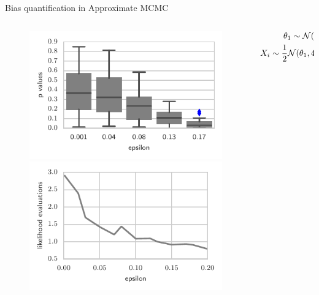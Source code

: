 \documentclass{beamer}
\begin{document}
  \begin{frame}{Bias quantification in Approximate MCMC}
\begin{columns}
        \begin{column}{.55\textwidth}
        \begin{figure}
           \includegraphics[width=\textwidth]{img/Heiko1} 
           
            \includegraphics[width=\textwidth]{img/Heiko2}
        \end{figure}
        \end{column}
        \begin{column}{.45\textwidth}
        \begin{align*}
\theta_{1}\sim{\cal N}(0,10);\theta_{2}\sim{\cal N}(0,1)\\
X_{i}\sim\frac{1}{2}{\cal N}(\theta_{1},4)+\frac{1}{2}{\cal N}(\theta_{1}+\theta_{2},4) & .
\end{align*}


\end{column}
\end{columns}
\end{frame}
\end{document}
